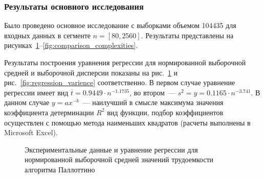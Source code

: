 \documentclass[a4paper, article, 14pt]{extarticle}
\begin{document}
\subsubsection{Результаты основного исследования}\label{subsec:results_part_2}

Было проведено основное исследование с выборками объемом 104435 для входных данных в сегменте $n = [80, 2560]$. Результаты представлены на рисунках~\ref{fig:regression_mean}--\ref{fig:comparison_complexities}.

Результаты построения уравнения регрессии для нормированной выборочной средней и выборочной дисперсии показаны на рис.~\ref{fig:regression_mean} и рис.~\ref{fig:regression_varience} соответственно. В первом случае уравнение регрессии имеет вид $\overline{t} = 0.9449 \cdot n^{-1.1735}$, во втором~--- $s^2 = y = 0.1165 \cdot n^{-3.741}$. В данном случае $y = ax^{-b}$~--- наилучший в смысле максимума значения коэффициента детерминации $R^2$ вид функции, подбор коэффициентов осуществлен с помощью метода наименьших квадратов (расчеты выполнены в Microsoft Excel).

\begin{figure}[h]
	\caption{Экспериментальные данные и уравнение регрессии для нормированной выборочной средней значений трудоемкости алгоритма Паллоттино}
	\label{fig:regression_mean}
\end{figure}
\end{document}
